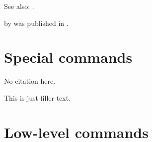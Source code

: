 \documentclass[a4paper]{article}
\begin{document}

See also: .

 by \citeauthor{companion} was
published in \citeyear{companion}.

\section*{Special commands}


No citation here.\nocite{knuth:ct}




This is just filler text.

\section*{Low-level commands}









\printbibliography
\end{document}
